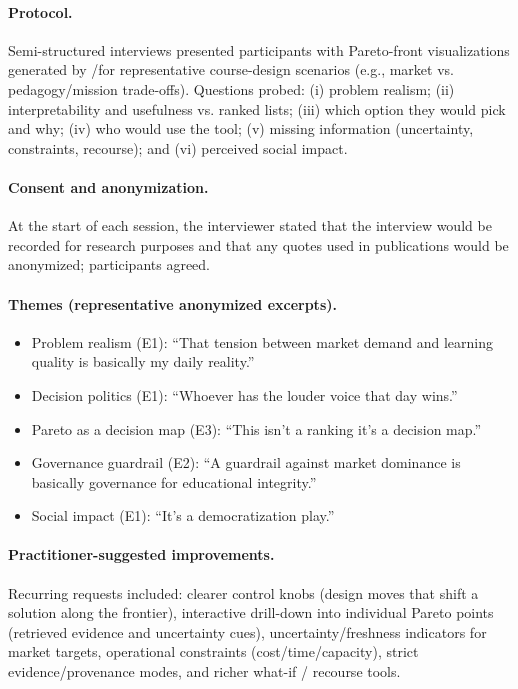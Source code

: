 \paragraph{Protocol.} Semi-structured interviews presented participants with Pareto-front visualizations generated by \ADS/\MAPE for representative course-design scenarios (e.g., market vs. pedagogy/mission trade-offs). Questions probed: (i) problem realism; (ii) interpretability and usefulness vs. ranked lists; (iii) which option they would pick and why; (iv) who would use the tool; (v) missing information (uncertainty, constraints, recourse); and (vi) perceived social impact.

\paragraph{Consent and anonymization.} At the start of each session, the interviewer stated that the interview would be recorded for research purposes and that any quotes used in publications would be anonymized; participants agreed.

\paragraph{Themes (representative anonymized excerpts).}
\begin{itemize}
  \item {Problem realism (E1):} ``That tension between market demand and learning quality is basically my daily reality.''
  \item {Decision politics (E1):} ``Whoever has the louder voice that day wins.''
  \item {Pareto as a decision map (E3):} ``This isn't a ranking it's a decision map.''
  \item {Governance guardrail (E2):} ``A guardrail against market dominance is basically governance for educational integrity.''
  \item {Social impact (E1):} ``It's a democratization play.''
\end{itemize}

\paragraph{Practitioner-suggested improvements.} Recurring requests included: clearer control knobs (design moves that shift a solution along the frontier), interactive drill-down into individual Pareto points (retrieved evidence and uncertainty cues), uncertainty/freshness indicators for market targets, operational constraints (cost/time/capacity), strict evidence/provenance modes, and richer what-if / recourse tools.

